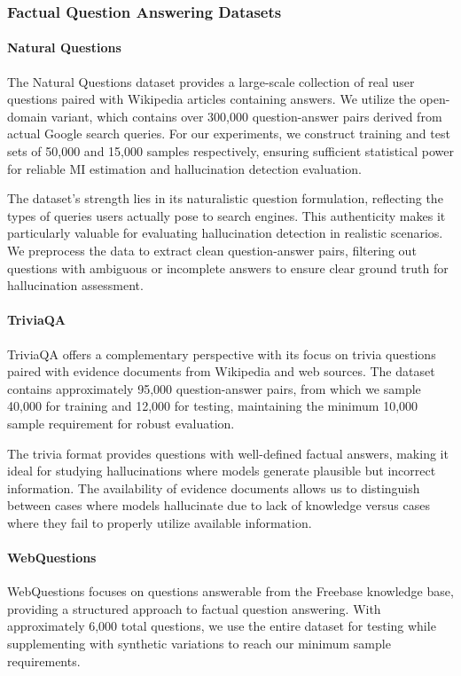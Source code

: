 \subsubsection{Factual Question Answering Datasets}

\paragraph{Natural Questions}
The Natural Questions dataset \citep{kwiatkowski2019natural} provides a large-scale collection of real user questions paired with Wikipedia articles containing answers. We utilize the open-domain variant, which contains over 300,000 question-answer pairs derived from actual Google search queries. For our experiments, we construct training and test sets of 50,000 and 15,000 samples respectively, ensuring sufficient statistical power for reliable MI estimation and hallucination detection evaluation.

The dataset's strength lies in its naturalistic question formulation, reflecting the types of queries users actually pose to search engines. This authenticity makes it particularly valuable for evaluating hallucination detection in realistic scenarios. We preprocess the data to extract clean question-answer pairs, filtering out questions with ambiguous or incomplete answers to ensure clear ground truth for hallucination assessment.

\paragraph{TriviaQA}
TriviaQA \citep{joshi2017triviaqa} offers a complementary perspective with its focus on trivia questions paired with evidence documents from Wikipedia and web sources. The dataset contains approximately 95,000 question-answer pairs, from which we sample 40,000 for training and 12,000 for testing, maintaining the minimum 10,000 sample requirement for robust evaluation.

The trivia format provides questions with well-defined factual answers, making it ideal for studying hallucinations where models generate plausible but incorrect information. The availability of evidence documents allows us to distinguish between cases where models hallucinate due to lack of knowledge versus cases where they fail to properly utilize available information.

\paragraph{WebQuestions}
WebQuestions \citep{berant2013semantic} focuses on questions answerable from the Freebase knowledge base, providing a structured approach to factual question answering. With approximately 6,000 total questions, we use the entire dataset for testing while supplementing with synthetic variations to reach our minimum sample requirements.

